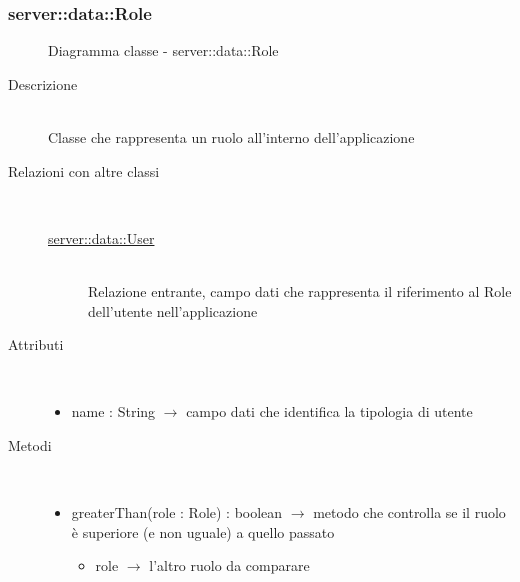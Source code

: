 \subsubsection[Role]{server::data::Role}
\begin{figure}[H]
	\centering
	\caption{Diagramma classe - server::data::Role}
\end{figure}\begin{description}
\item[Descrizione] \hfill \\
Classe che rappresenta un ruolo all'interno dell'applicazione
\item[Relazioni con altre classi] \hfill \\
\vspace{-7mm}
\begin{description}
	\item[\hyperlink{server::data::User}{server::data::User}] \hfill \\
	Relazione entrante, campo dati che rappresenta il riferimento al Role dell'utente nell'applicazione
\end{description}

\item[Attributi] \hfill \\
\vspace{-7mm}
\begin{itemize}
	\item name : String $\rightarrow$ campo dati che identifica la tipologia di utente
\end{itemize}

\item[Metodi] \hfill \\
\vspace{-7mm}
\begin{itemize}
	\item greaterThan(role : Role) : boolean $\rightarrow$ metodo che controlla se il ruolo è superiore (e non uguale) a quello passato\begin{itemize}
		\item role $\rightarrow$ l'altro ruolo da comparare
	\end{itemize}
	

\end{itemize}
\end{description}
